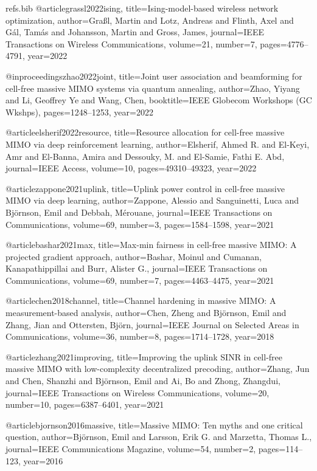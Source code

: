 \begin{filecontents*}{refs.bib}
@article{grassl2022ising,
  title={Ising-model-based wireless network optimization},
  author={Gra{\ss}l, Martin and Lotz, Andreas and Flinth, Axel and G{\'a}l, Tam{\'a}s and Johansson, Martin and Gross, James},
  journal={IEEE Transactions on Wireless Communications},
  volume={21},
  number={7},
  pages={4776--4791},
  year={2022}
}

@inproceedings{zhao2022joint,
  title={Joint user association and beamforming for cell-free massive MIMO systems via quantum annealing},
  author={Zhao, Yiyang and Li, Geoffrey Ye and Wang, Chen},
  booktitle={IEEE Globecom Workshops (GC Wkshps)},
  pages={1248--1253},
  year={2022}
}

@article{elsherif2022resource,
  title={Resource allocation for cell-free massive MIMO via deep reinforcement learning},
  author={Elsherif, Ahmed R. and El-Keyi, Amr and El-Banna, Amira and Dessouky, M. and El-Samie, Fathi E. Abd},
  journal={IEEE Access},
  volume={10},
  pages={49310--49323},
  year={2022}
}

@article{zappone2021uplink,
  title={Uplink power control in cell-free massive MIMO via deep learning},
  author={Zappone, Alessio and Sanguinetti, Luca and Bj\"ornson, Emil and Debbah, M{\'e}rouane},
  journal={IEEE Transactions on Communications},
  volume={69},
  number={3},
  pages={1584--1598},
  year={2021}
}

@article{bashar2021max,
  title={Max-min fairness in cell-free massive MIMO: A projected gradient approach},
  author={Bashar, Moinul and Cumanan, Kanapathippillai and Burr, Alister G.},
  journal={IEEE Transactions on Communications},
  volume={69},
  number={7},
  pages={4463--4475},
  year={2021}
}

@article{chen2018channel,
  title={Channel hardening in massive MIMO: A measurement-based analysis},
  author={Chen, Zheng and Bj{\"o}rnson, Emil and Zhang, Jian and Ottersten, Bj{\"o}rn},
  journal={IEEE Journal on Selected Areas in Communications},
  volume={36},
  number={8},
  pages={1714--1728},
  year={2018}
}

@article{zhang2021improving,
  title={Improving the uplink SINR in cell-free massive MIMO with low-complexity decentralized precoding},
  author={Zhang, Jun and Chen, Shanzhi and Bj{\"o}rnson, Emil and Ai, Bo and Zhong, Zhangdui},
  journal={IEEE Transactions on Wireless Communications},
  volume={20},
  number={10},
  pages={6387--6401},
  year={2021}
}

@article{bjornson2016massive,
  title={Massive MIMO: Ten myths and one critical question},
  author={Bj{\"o}rnson, Emil and Larsson, Erik G. and Marzetta, Thomas L.},
  journal={IEEE Communications Magazine},
  volume={54},
  number={2},
  pages={114--123},
  year={2016}
}
\end{filecontents*}

